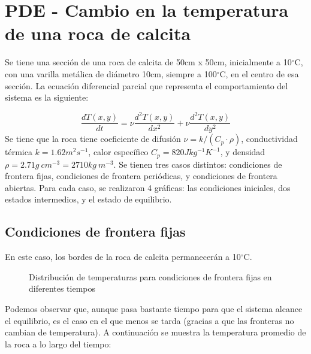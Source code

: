 \documentclass{article}
\begin{document}
\section{PDE - Cambio en la temperatura de una roca de calcita}
Se tiene una sección de una roca de calcita de 50cm x 50cm, inicialmente a 10$^\circ$C, con una varilla metálica de diámetro 10cm, siempre a 100$^\circ$C, en el centro de esa sección. La ecuación diferencial parcial que representa el comportamiento del sistema es la siguiente:

\begin{equation}
    \frac{dT(x,y)}{dt} = \nu\frac{d^{2}T(x,y)}{dx^{2}} + \nu\frac{d^{2}T(x,y)}{dy^{2}} 
\end{equation}
Se tiene que la roca tiene coeficiente de difusión $\nu = k/(C_p\cdot\rho)$, conductividad térmica $k = 1.62m^2s^{-1}$, calor específico $C_p = 820Jkg^{-1}K^{-1}$, y densidad $\rho = 2.71g\ cm^{-3} = 2710kg\ m^{-3}$. Se tienen tres casos distintos: condiciones de frontera fijas, condiciones de frontera periódicas, y condiciones de frontera abiertas. Para cada caso, se realizaron 4 gráficas: las condiciones iniciales, dos estados intermedios, y el estado de equilibrio.

\subsection*{Condiciones de frontera fijas}
En este caso, los bordes de la roca de calcita permanecerán a 10$^\circ$C.

\begin{figure}[H]
    \centering
    \label{fig:my_label}
\end{figure}
\begin{figure}[H]
    \centering
        \caption{Distribución de temperaturas para condiciones de frontera fijas en diferentes tiempos}
    \label{fig:my_label}
\end{figure}

Podemos observar que, aunque pasa bastante tiempo para que el sistema alcance el equilibrio, es el caso en el que menos se tarda (gracias a que las fronteras no cambian de temperatura). A continuación se muestra la temperatura promedio de la roca a lo largo del tiempo:
\end{document}
